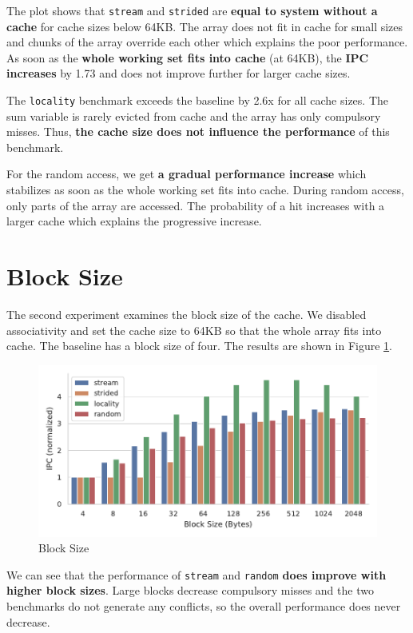 \documentclass[a4paper]{article}
\begin{document}
The plot shows that \texttt{stream} and \texttt{strided} are \textbf{equal to
system without a cache} for cache sizes below 64KB. The array does not fit in
cache for small sizes and chunks of the array override each other which explains
the poor performance. As soon as the \textbf{whole working set fits into cache}
(at 64KB), the \textbf{IPC increases} by 1.73 and does not improve further for
larger cache sizes.

The \texttt{locality} benchmark exceeds the baseline by 2.6x for all cache sizes.
The sum variable is rarely evicted from cache and the array has only compulsory
misses. Thus, \textbf{the cache size does not influence the performance} of this
benchmark.

For the random access, we get \textbf{a gradual performance increase} which stabilizes as
soon as the whole working set fits into cache. During random access, only parts
of the array are accessed. The probability of a hit increases with a larger cache
which explains the progressive increase.

\section{Block Size}

The second experiment examines the block size of the cache. We disabled
associativity and set the cache size to 64KB so that the whole array fits into
cache. The baseline has a block size of four. The results are shown in Figure
\ref{fig:block-size}.
\begin{figure}
    \centering
    \includegraphics[width=\textwidth]{block_size}
    \caption{Block Size}
    \label{fig:block-size}
\end{figure}

We can see that the performance of \texttt{stream} and \texttt{random} \textbf{does
improve with higher block sizes}. Large blocks decrease compulsory misses and the
two benchmarks do not generate any conflicts, so the overall performance does
never decrease.
\end{document}
